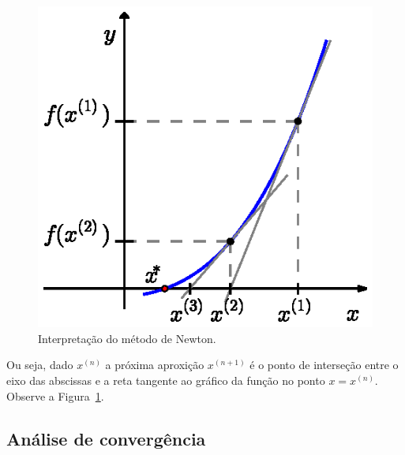 \begin{figure}[h]
  \centering
  \includegraphics{./cap_equacao1d/pics/metodo_de_Newton/metodo_de_Newton.eps}  
  \caption{Interpretação do método de Newton.}
  \label{fig:metodo_de_Newton}
\end{figure}

Ou seja, dado $x^{(n)}$ a próxima aproxição $x^{(n+1)}$ é o ponto de interseção entre o eixo das abscissas e a reta tangente ao gráfico da função no ponto $x = x^{(n)}$. Observe a Figura~\ref{fig:metodo_de_Newton}.

\subsection{Análise de convergência}

